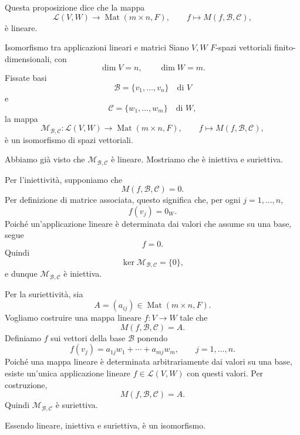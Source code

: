 \documentclass[a4paper]{article}
\begin{document}
Questa proposizione dice che la mappa
\[
    \mathcal{L}(V,W)\to \operatorname{Mat}(m\times n,F),
    \qquad
    f\mapsto M(f,\mathcal{B},\mathcal{C}),
\]
è lineare.

\begin{snippetproposition}{Isomorfismo tra applicazioni lineari e matrici}
    Siano \(V,W\) \(F\)-spazi vettoriali finito-dimensionali, con
    \[
        \dim V=n,
        \qquad
        \dim W=m.
    \]
    Fissate basi
    \[
        \mathcal{B}=\{v_1,\ldots,v_n\}
        \quad\text{di }V
    \]
    e
    \[
        \mathcal{C}=\{w_1,\ldots,w_m\}
        \quad\text{di }W,
    \]
    la mappa
    \[
        \mathcal{M}_{\mathcal{B},\mathcal{C}}:
        \mathcal{L}(V,W)\to \operatorname{Mat}(m\times n,F),
        \qquad
        f\mapsto M(f,\mathcal{B},\mathcal{C}),
    \]
    è un isomorfismo di spazi vettoriali.
\end{snippetproposition}

\begin{snippetproof}{}
    Abbiamo già visto che \(\mathcal{M}_{\mathcal{B},\mathcal{C}}\) è lineare. Mostriamo che è iniettiva e suriettiva.

    Per l'iniettività, supponiamo che
    \[
        M(f,\mathcal{B},\mathcal{C})=0.
    \]
    Per definizione di matrice associata, questo significa che, per ogni \(j=1,\ldots,n\),
    \[
        f(v_j)=0_W.
    \]
    Poiché un'applicazione lineare è determinata dai valori che assume su una base, segue
    \[
        f=0.
    \]
    Quindi
    \[
        \ker \mathcal{M}_{\mathcal{B},\mathcal{C}}=\{0\},
    \]
    e dunque \(\mathcal{M}_{\mathcal{B},\mathcal{C}}\) è iniettiva.

    Per la suriettività, sia
    \[
        A=(a_{ij})\in\operatorname{Mat}(m\times n,F).
    \]
    Vogliamo costruire una mappa lineare \(f:V\to W\) tale che
    \[
        M(f,\mathcal{B},\mathcal{C})=A.
    \]
    Definiamo \(f\) sui vettori della base \(\mathcal{B}\) ponendo
    \[
        f(v_j)=a_{1j}w_1+\cdots+a_{mj}w_m,
        \qquad
        j=1,\ldots,n.
    \]
    Poiché una mappa lineare è determinata arbitrariamente dai valori su una base, esiste un'unica applicazione lineare \(f\in\mathcal{L}(V,W)\) con questi valori. Per costruzione,
    \[
        M(f,\mathcal{B},\mathcal{C})=A.
    \]
    Quindi \(\mathcal{M}_{\mathcal{B},\mathcal{C}}\) è suriettiva.

    Essendo lineare, iniettiva e suriettiva, è un isomorfismo.
\end{snippetproof}
\end{document}
